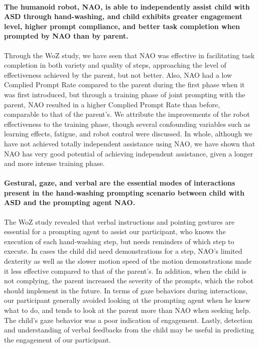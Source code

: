\documentclass{ut-thesis}
\begin{document}
\paragraph{The humanoid robot, NAO, is able to independently assist child with ASD through hand-washing, and child exhibits greater engagement level, higher prompt compliance, and better task completion when prompted by NAO than by parent.}
Through the WoZ study, we have seen that NAO was effective in facilitating task completion in both variety and quality of steps, approaching the level of effectiveness achieved by the parent, but not better.  Also, NAO had a low Complied Prompt Rate compared to the parent during the first phase when it was first introduced, but through a training phase of joint prompting with the parent, NAO resulted in a higher Complied Prompt Rate than before, comparable to that of the parent's.  We attribute the improvements of the robot effectiveness to the training phase, though several confounding variables such as learning effects, fatigue, and robot control were discussed.  In whole, although we have not achieved totally independent assistance using NAO, we have shown that NAO has very good potential of achieving independent assistance, given a longer and more intense training phase.

\paragraph{Gestural, gaze, and verbal are the essential modes of interactions present in the hand-washing prompting scenario between child with ASD and the prompting agent NAO.}
The WoZ study revealed that verbal instructions and pointing gestures are essential for a prompting agent to assist our participant, who knows the execution of each hand-washing step, but needs reminders of which step to execute.  In cases the child did need demonstrations for a step, NAO's limited dexterity as well as the slower motion speed of the motion demonstrations made it less effective compared to that of the parent's.  In addition, when the child is not complying, the parent increased the severity of the prompts, which the robot should implement in the future.  In terms of gaze behaviors during interactions, our participant generally avoided looking at the prompting agent when he knew what to do, and tends to look at the parent more than NAO when seeking help.  The child's gaze behavior was a poor indication of engagement.  Lastly, detection and understanding of verbal feedbacks from the child may be useful in predicting the engagement of our participant.
\end{document}
